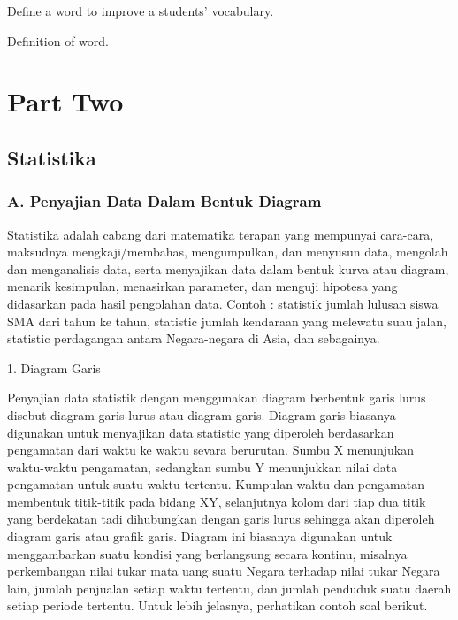 \documentclass[11pt,fleqn]{book} %
\begin{document}
{Define a word to improve a students' vocabulary.

\begin{vocabulary}[Word]
Definition of word.
\end{vocabulary}


\part{Part Two}


\chapter{Statistika}

\section{A. Penyajian Data Dalam Bentuk Diagram}

Statistika adalah cabang dari matematika terapan yang mempunyai cara-cara, maksudnya mengkaji/membahas, mengumpulkan, dan menyusun data, mengolah dan menganalisis data, serta menyajikan data dalam bentuk kurva atau diagram, menarik kesimpulan, menasirkan parameter, dan menguji hipotesa yang didasarkan pada hasil pengolahan data. Contoh : statistik jumlah lulusan siswa SMA dari tahun ke tahun, statistic jumlah kendaraan yang melewatu suau jalan, statistic perdagangan antara Negara-negara di Asia, dan sebagainya.

1.	Diagram Garis

Penyajian data statistik dengan menggunakan diagram berbentuk garis lurus disebut diagram garis lurus atau diagram garis. Diagram garis biasanya digunakan untuk menyajikan data statistic yang diperoleh berdasarkan pengamatan dari waktu ke waktu sevara berurutan.
	Sumbu X menunjukan waktu-waktu pengamatan, sedangkan sumbu Y menunjukkan nilai data pengamatan untuk suatu waktu tertentu. Kumpulan waktu dan pengamatan membentuk titik-titik pada bidang XY, selanjutnya kolom dari tiap dua titik yang berdekatan tadi dihubungkan dengan garis lurus sehingga akan diperoleh diagram garis atau grafik garis. Diagram ini biasanya digunakan untuk menggambarkan suatu kondisi yang berlangsung secara kontinu, misalnya perkembangan nilai tukar mata uang suatu Negara terhadap nilai tukar Negara lain, jumlah penjualan setiap waktu tertentu, dan jumlah penduduk suatu daerah setiap periode tertentu. Untuk lebih jelasnya, perhatikan contoh soal berikut.
	
}
\end{document}
